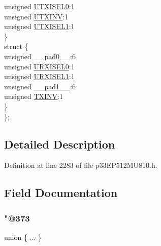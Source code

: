 \begin{DoxyCompactItemize}
\begin{tabbing}
\>\>unsigned \hyperlink{structtag_u4_s_t_a_b_i_t_s_aaff1f97a591df18ff20cf189a2944089}{UTXISEL0}:1\\
\>\>unsigned \hyperlink{structtag_u4_s_t_a_b_i_t_s_a08dde9c5ebe6558bfae4ea659190ddb6}{UTXINV}:1\\
\>\>unsigned \hyperlink{structtag_u4_s_t_a_b_i_t_s_af7ce0d24148cffc8fc3d8abccf37ea9f}{UTXISEL1}:1\\
\>\} \\
\>struct \{\\
\>\>unsigned \hyperlink{structtag_u4_s_t_a_b_i_t_s_adf71f3d8410c1f1dbbc96680a92c49af}{\_\_pad0\_\_}:6\\
\>\>unsigned \hyperlink{structtag_u4_s_t_a_b_i_t_s_af79a21216ad16ee2c61e03f238f42e6a}{URXISEL0}:1\\
\>\>unsigned \hyperlink{structtag_u4_s_t_a_b_i_t_s_a18f8693c16d1aaec33bf9058dc1ea2d2}{URXISEL1}:1\\
\>\>unsigned \hyperlink{structtag_u4_s_t_a_b_i_t_s_acaf2d0924a107ec6e8d2e31febaf66f9}{\_\_pad1\_\_}:6\\
\>\>unsigned \hyperlink{structtag_u4_s_t_a_b_i_t_s_a2baa3dcc3e10cb6a9f3fce197d05376b}{TXINV}:1\\
\>\} \\
\}; \\

\end{tabbing}\end{DoxyCompactItemize}


\subsection{Detailed Description}


Definition at line 2283 of file p33\+E\+P512\+M\+U810.\+h.



\subsection{Field Documentation}
\mbox{\label{structtag_u4_s_t_a_b_i_t_s_ac8b9157c8204493e35c9324f92edf3d9}} 
\subsubsection{\texorpdfstring{"@373}{@373}}
{\footnotesize\ttfamily union \{ ... \} }

\mbox{\label{structtag_u4_s_t_a_b_i_t_s_adf71f3d8410c1f1dbbc96680a92c49af}} 
